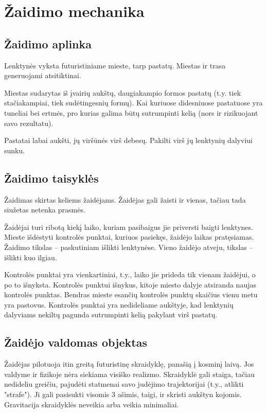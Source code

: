 \section{Žaidimo mechanika}
\subsection{Žaidimo aplinka}

Lenktynės vyksta futuristiniame mieste, tarp pastatų.
Miestas ir trasa generuojami atsitiktinai.

Miestas sudarytas iš įvairių aukštų, daugiakampio formos pastatų (t.y. tiek stačiakampiai, tiek sudėtingesnių formų).
Kai kuriuose didesniuose pastatuose yra tuneliai bei ertmės, pro kurias galima būtų sutrumpinti kelią (nors ir rizikuojant savo rezultatu).

Pastatai labai aukšti, jų viršūnės virš debesų.
Pakilti virš jų lenktynių dalyviui sunku.

\subsection{Žaidimo taisyklės}

Žaidimas skirtas keliems žaidėjams.
Žaidėjas gali žaisti ir vienas, tačiau tada siužetas netenka prasmės.

Žaidėjai turi ribotą kiekį laiko, kuriam pasibaigus jie priversti baigti lenktynes.
Mieste išdėstyti kontrolės punktai, kuriuos pasiekęs, žaidėjo laikas pratęsiamas.
Žaidimo tikslas -- paskutiniam išlikti lenktynėse.
Vieno žaidėjo atveju, tikslas -- išlikti kuo ilgiau.

Kontrolės punktai yra vienkartiniai, t.y., laiko jie prideda tik vienam žaidėjui, o po to išnyksta.
Kontrolės punktui išnykus, kitoje miesto dalyje atsiranda naujas kontrolės punktas.
Bendras mieste esančių kontrolės punktų skaičius vienu metu yra pastovus.
Kontrolės punktai yra nedideliame aukštyje, kad lenktynių dalyviams nekiltų pagunda sutrumpinti kelią pakylant virš pastatų.

\subsection{Žaidėjo valdomas objektas}

Žaidėjas pilotuoja itin greitą futuristinę skraidyklę, panašią į kosminį laivą.
Jos valdyme ir fizikoje nėra siekiama visiško realizmo.
Skraidyklė gali staiga, tačiau nedideliu greičiu, pajudėti statmenai savo judėjimo trajektorijai (t.y., atlikti "strafe").
Ji gali pasisukti visomis 3 ašimis, taigi, ir skristi aukštyn kojomis.
Gravitacija skraidyklės neveikia arba veikia minimaliai.

